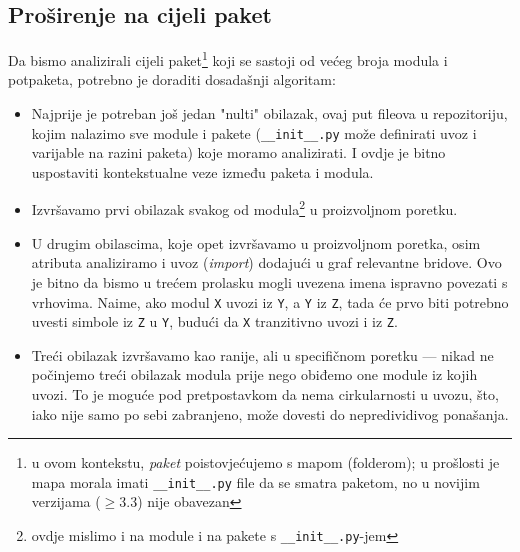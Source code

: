 \subsection{Proširenje na cijeli paket}
Da bismo analizirali cijeli paket\footnote{u ovom kontekstu, \emph{paket} poistovjećujemo s
mapom (folderom); u prošlosti je mapa
morala imati \texttt{__init__.py} file da se smatra paketom, no u novijim verzijama
($\ge$3.3) nije obavezan}
koji se sastoji od većeg broja modula i potpaketa, potrebno je doraditi dosadašnji algoritam:
\begin{itemize}
\item Najprije je potreban još jedan "nulti" obilazak, ovaj put fileova u repozitoriju, kojim
nalazimo sve module i pakete (\texttt{__init__.py} može definirati uvoz i varijable na razini paketa)
koje moramo analizirati. I ovdje je bitno uspostaviti kontekstualne veze između paketa i modula.

\item Izvršavamo prvi obilazak svakog od modula\footnote{ovdje mislimo i na module i na pakete s
\texttt{__init__.py}-jem}
u proizvoljnom poretku.

\item U drugim obilascima, koje opet izvršavamo u proizvoljnom poretka, osim atributa analiziramo i
uvoz (\emph{import}) dodajući u graf relevantne bridove.
Ovo je bitno da bismo u trećem prolasku mogli uvezena imena ispravno povezati s vrhovima. Naime,
ako modul \texttt{X} uvozi iz \texttt{Y}, a \texttt{Y} iz \texttt{Z}, tada će prvo biti potrebno
uvesti simbole iz \texttt{Z} u \texttt{Y}, budući da \texttt{X} tranzitivno
uvozi i iz \texttt{Z}.

\item Treći obilazak izvršavamo kao ranije, ali u specifičnom poretku --- nikad
ne počinjemo treći obilazak modula prije nego obiđemo one module iz kojih uvozi.
To je moguće pod pretpostavkom da nema cirkularnosti u uvozu, što, iako nije
samo po sebi zabranjeno, može dovesti do nepredividivog ponašanja.

\end{itemize}


